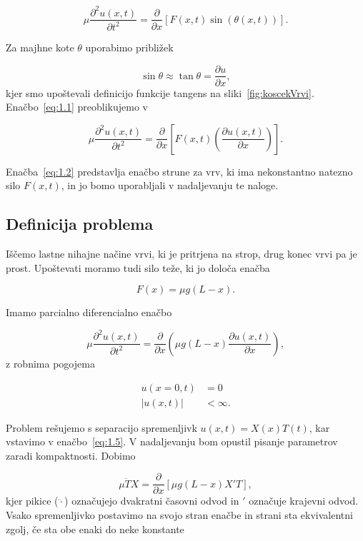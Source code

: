 \begin{equation}
\label{eq:1.1}
 \mu \frac{\partial ^2 u(x, t)}{\partial t ^2} = \frac{\partial }{\partial x} \left[ F(x, t) \sin \left( \theta (x, t) \right) \right].
\end{equation}

Za majhne kote \( \theta \) uporabimo približek

\[ \sin \theta \approx \tan \theta = \frac{\partial u}{\partial x},
\]
kjer smo upoštevali definicijo funkcije tangens na sliki~\ref{fig:koscekVrvi}. Enačbo~\eqref{eq:1.1} preoblikujemo v

\begin{equation}
\label{eq:1.2}
\mu \frac{\partial ^2 u(x, t)}{\partial t ^2} = \frac{\partial }{\partial x}  \left[ F(x, t) \left( \frac{\partial u(x, t)}{\partial x}  \right) \right].
\end{equation}

Enačba~\eqref{eq:1.2} predstavlja enačbo strune za vrv, ki ima nekonstantno natezno silo \( F(x, t) \), in jo bomo uporabljali v nadaljevanju te naloge.

\subsection{Definicija problema}

Iščemo lastne nihajne načine vrvi, ki je pritrjena na strop, drug konec vrvi pa je prost. Upoštevati moramo tudi silo teže, ki jo določa enačba

\[  F(x) = \mu g (L - x).
\]

Imamo parcialno diferencialno enačbo

\begin{equation}
\label{eq:1.5}
\mu \frac{\partial ^2 u(x, t)}{\partial t ^2} = \frac{\partial }{\partial x} \left( \mu g (L - x) \frac{\partial u(x, t) }{\partial x} \right),
\end{equation}
z robnima pogojema

\begin{align} \label{eq:1.3}
  u(x = 0, t) &= 0 \\ \label{eq:1.4}
  \left| u(x, t) \right| &< \infty.
\end{align}

Problem rešujemo s separacijo spremenljivk \( u(x, t) = X(x) T(t) \), kar vstavimo v enačbo~\eqref{eq:1.5}. V nadaljevanju bom opustil pisanje parametrov zaradi kompaktnosti. Dobimo

\[ \mu \ddot{T}  X = \frac{\partial }{\partial x} \left[ \mu g (L - x) X' T \right],
\]
kjer pikice (\( \ddot{\cdot} \)) označujejo dvakratni časovni odvod in \( ' \) označuje krajevni odvod. Vsako spremenljivko postavimo na svojo stran enačbe in strani sta ekvivalentni zgolj, če sta obe enaki do neke konstante

